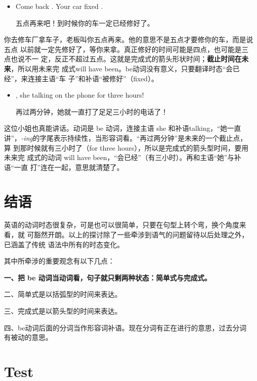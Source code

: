 \begin{itemize}
\item  Come back . Your car  fixed .

  五点再来吧！到时候你的车一定已经修好了。
\end{itemize}

你去修车厂拿车子，老板叫你五点再来。他的意思不是五点才要修你的车，而是说五点
以前就一定先修好了，等你来拿。真正修好的时间可能是四点，也可能是三点也说不一
定，反正不超过五点。这就是完成式的箭头形状时间；\textbf{截止时间在未来}，所以用未来完
成式will have been。be动词没有意义，只要翻译时态“会已经”，来连接主语“车
子”和补语“被修好”（fixed）。

\begin{itemize}
\item {}, she  talking on the phone for
  three hours!

  再过两分钟，她就一直打了足足三小时的电话了！
\end{itemize}

这位小姐也真能讲话。动词是 be 动词，连接主语 she 和补语talking，“她一直
讲”，\emph{-ing}的字尾表示持续性，当形容词看。“再过两分钟”是未来的一个截止点，算
到那时候就有三小时了（for three hours），所以是完成式的箭头型时间，要用未来完
成式的动词 will have been，“会已经”（有三小时）。再和主语“她”与补语“一直
打”连在一起，意思就清楚了。

\section{结语}

英语的动词时态很复杂，可是也可以很简单，只要在句型上转个弯，换个角度来看，就
可豁然开朗。以上的探讨除了一些牵涉到语气的问题留待以后处理之外，已涵盖了传统
语法中所有的时态变化。

其中所牵涉的重要观念有以下几点：

{\bfseries 一、把 be 动词当动词看，句子就只剩两种状态：简单式与完成式。

  二、简单式是以括弧型的时间来表达。

  三、完成式是以箭头型的时间来表达。

  四、be动词后面的分词当作形容词补语。现在分词有正在进行的意思，过去分词有被动的意思。}


\section{Test}

